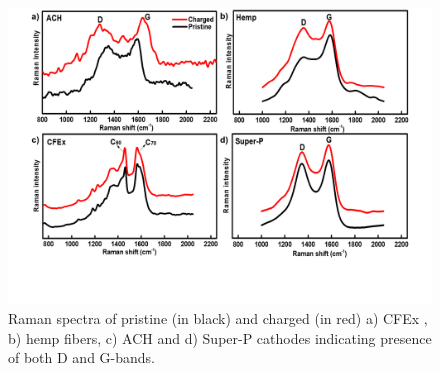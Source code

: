 \documentclass{article}
\begin{document}
 \begin{figure}[tbh!]
  \centering
  \includegraphics[width=\textwidth]{figures/raman}
    \caption{Raman spectra of pristine (in black) and charged (in red) a) CFEx , b) hemp fibers, c) ACH and d) Super-P cathodes indicating presence of both D and G-bands.}
  \label{figures:raman}
\end{figure}
\end{document}
